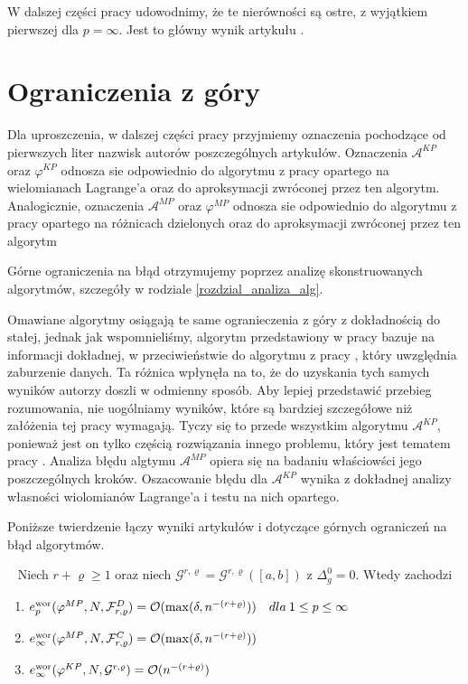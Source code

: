 \documentclass[oik, pdftex, robocza, man]{mgrwms}
\begin{document}
    W dalszej części pracy udowodnimy, że te nierówności są ostre, z wyjątkiem pierwszej dla $p=\infty$. Jest to główny wynik artykułu \cite{AoP}.


\section{Ograniczenia z góry}


    Dla uproszczenia, w dalszej części pracy przyjmiemy oznaczenia pochodzące od pierwszych liter nazwisk autorów poszczególnych artykułów. Oznaczenia $\mathcal{A}^{KP}$ oraz $\varphi^{KP}$ odnosza sie odpowiednio do algorytmu z pracy \cite{CoDF} opartego na wielomianach Lagrange'a oraz do aproksymacji zwróconej przez ten algorytm. Analogicznie, oznaczenia $\mathcal{A}^{MP}$ oraz $\varphi^{MP}$ odnosza sie odpowiednio do algorytmu z pracy \cite{AoP} opartego na różnicach dzielonych oraz do aproksymacji zwróconej przez ten algorytm

    Górne ograniczenia na błąd otrzymujemy poprzez analizę skonstruowanych algorytmów, szczegóły w rodziale \ref{rozdzial_analiza_alg}.
    
    Omawiane algorytmy osiągają te same ogranieczenia z góry z dokładnością do stałej, jednak jak wspomnieliśmy, algorytm przedstawiony w pracy \cite{CoDF} bazuje na informacji dokładnej, w przeciwieństwie do algorytmu z pracy \cite{AoP}, który uwzględnia zaburzenie danych. Ta różnica wpłynęła na to, że do uzyskania tych samych wyników autorzy doszli w odmienny sposób. Aby lepiej przedstawić przebieg rozumowania, nie uogólniamy wyników, które są bardziej szczegółowe niż załóżenia tej pracy wymagają. Tyczy się to przede wszystkim algorytmu $\mathcal{A}^{KP}$, ponieważ jest on tylko częścią rozwiązania innego problemu, który jest tematem pracy \cite{CoDF}. Analiza błędu algtymu $\mathcal{A}^{MP}$ opiera się na badaniu właściowści jego poszczególnych kroków. Oszacowanie błędu dla $\mathcal{A}^{KP}$ wynika z dokładnej analizy własności wiolomianów Lagrange'a i testu na nich opartego.

    Poniższe twierdzenie łączy wyniki artykułów \cite{CoDF} i \cite{AoP} dotyczące górnych ograniczeń na błąd algorytmów.
    
    \begin{thm}~ \label{thm:1:ograniczenia_z_gory}
        Niech $r+\varrho \geq 1$ oraz niech $\mathcal{G}^{r,\varrho} = \mathcal{G}^{r,\varrho}([a,b])$ z $\Delta_{g}^{0} = 0$. Wtedy zachodzi
        \begin{enumerate}[label=(\roman*)]
            \item \label{thm:1:i}$e_{p}^{\mathrm{wor}}(\varphi^{MP},N,\mathcal{F}_{r,\varrho}^{D}) = \mathcal{O}(\max(\delta, n^{-(r+\varrho)})) \quad dla \: 1 \leq p \leq \infty$
            \item \label{thm:1:ii}$e_{\infty}^{\mathrm{wor}}(\varphi^{MP},N,\mathcal{F}_{r,\varrho}^{C}) = \mathcal{O}(\max(\delta, n^{-(r+\varrho)}))$
            \item \label{thm:1:iii}$e_{\infty}^{\mathrm{wor}}(\varphi^{KP},N,\mathcal{G}^{r,\varrho}) = \mathcal{O}(n^{-(r+\varrho)})$
        \end{enumerate}
    \end{thm}
\end{document}

